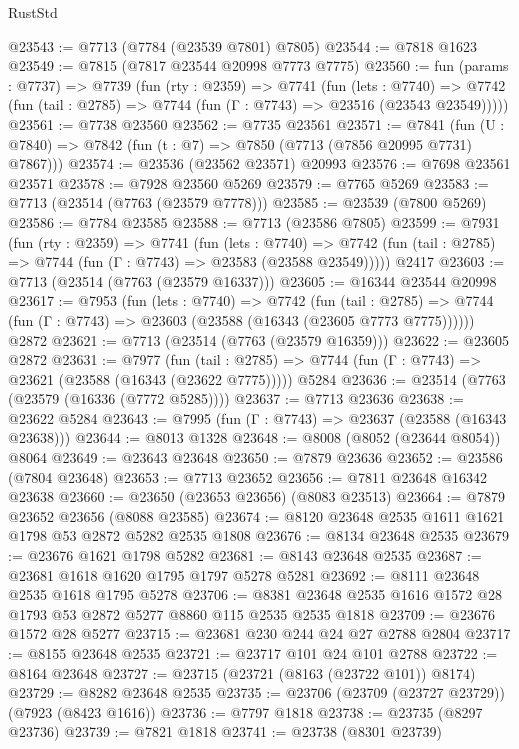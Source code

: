 \begin{lexlean}{RustStd}
\begin{coremodule}
@23543 := @7713 (@7784 (@23539 @7801) @7805)
@23544 := @7818 @1623
@23549 := @7815 (@7817 @23544 @20998 @7773 @7775)
@23560 := fun (params : @7737) =>
  @7739
    (fun (rty : @2359) =>
    @7741
      (fun (lets : @7740) =>
      @7742 (fun (tail : @2785) => @7744 (fun (Γ : @7743) => @23516 (@23543 @23549)))))
@23561 := @7738 @23560
@23562 := @7735 @23561
@23571 := @7841
    (fun (U : @7840) => @7842 (fun (t : @7) => @7850 (@7713 (@7856 @20995 @7731) @7867)))
@23574 := @23536 (@23562 @23571) @20993
@23576 := @7698 @23561 @23571
@23578 := @7928 @23560 @5269
@23579 := @7765 @5269
@23583 := @7713 (@23514 (@7763 (@23579 @7778)))
@23585 := @23539 (@7800 @5269)
@23586 := @7784 @23585
@23588 := @7713 (@23586 @7805)
@23599 := @7931
    (fun (rty : @2359) =>
    @7741
      (fun (lets : @7740) =>
      @7742 (fun (tail : @2785) => @7744 (fun (Γ : @7743) => @23583 (@23588 @23549)))))
    @2417
@23603 := @7713 (@23514 (@7763 (@23579 @16337)))
@23605 := @16344 @23544 @20998
@23617 := @7953
    (fun (lets : @7740) =>
    @7742
      (fun (tail : @2785) =>
      @7744 (fun (Γ : @7743) => @23603 (@23588 (@16343 (@23605 @7773 @7775))))))
    @2872
@23621 := @7713 (@23514 (@7763 (@23579 @16359)))
@23622 := @23605 @2872
@23631 := @7977
    (fun (tail : @2785) => @7744 (fun (Γ : @7743) => @23621 (@23588 (@16343 (@23622 @7775)))))
    @5284
@23636 := @23514 (@7763 (@23579 (@16336 (@7772 @5285))))
@23637 := @7713 @23636
@23638 := @23622 @5284
@23643 := @7995 (fun (Γ : @7743) => @23637 (@23588 (@16343 @23638)))
@23644 := @8013 @1328
@23648 := @8008 (@8052 (@23644 @8054)) @8064
@23649 := @23643 @23648
@23650 := @7879 @23636
@23652 := @23586 (@7804 @23648)
@23653 := @7713 @23652
@23656 := @7811 @23648 @16342 @23638
@23660 := @23650 (@23653 @23656) (@8083 @23513)
@23664 := @7879 @23652 @23656 (@8088 @23585)
@23674 := @8120 @23648 @2535 @1611 @1621 @1798 @53 @2872 @5282 @2535 @1808
@23676 := @8134 @23648 @2535
@23679 := @23676 @1621 @1798 @5282
@23681 := @8143 @23648 @2535
@23687 := @23681 @1618 @1620 @1795 @1797 @5278 @5281
@23692 := @8111 @23648 @2535 @1618 @1795 @5278
@23706 := @8381 @23648 @2535 @1616 @1572 @28 @1793 @53 @2872 @5277 @8860 @115 @2535 @2535 @1818
@23709 := @23676 @1572 @28 @5277
@23715 := @23681 @230 @244 @24 @27 @2788 @2804
@23717 := @8155 @23648 @2535
@23721 := @23717 @101 @24 @101 @2788
@23722 := @8164 @23648
@23727 := @23715 (@23721 (@8163 (@23722 @101)) @8174)
@23729 := @8282 @23648 @2535
@23735 := @23706 (@23709 (@23727 @23729)) (@7923 (@8423 @1616))
@23736 := @7797 @1818
@23738 := @23735 (@8297 @23736)
@23739 := @7821 @1818
@23741 := @23738 (@8301 @23739)

\end{coremodule}
\end{lexlean}
